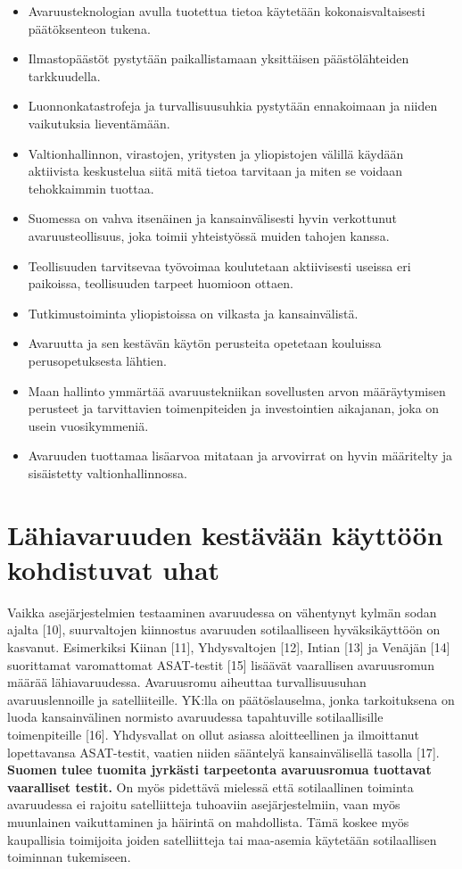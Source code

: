 \documentclass[nobib,finnish,oneside,openany,notoc,a4paper]{tufte-book}
\begin{document}
\begin{itemize}
\item Avaruusteknologian avulla tuotettua
tietoa käytetään kokonaisvaltaisesti päätöksenteon tukena.
\item Ilmastopäästöt pystytään paikallistamaan yksittäisen päästölähteiden
tarkkuudella.
\item Luonnonkatastrofeja ja turvallisuusuhkia pystytään
ennakoimaan ja niiden vaikutuksia lieventämään.
\item Valtionhallinnon, virastojen, yritysten ja yliopistojen välillä käydään aktiivista
keskustelua siitä mitä tietoa tarvitaan ja miten se voidaan tehokkaimmin
tuottaa.
\item Suomessa on vahva itsenäinen ja kansainvälisesti hyvin
verkottunut avaruusteollisuus, joka toimii yhteistyössä muiden tahojen
kanssa.
\item Teollisuuden tarvitsevaa työvoimaa koulutetaan aktiivisesti
useissa eri paikoissa, teollisuuden tarpeet huomioon ottaen.
\item Tutkimustoiminta yliopistoissa on vilkasta ja kansainvälistä.
\item Avaruutta ja sen kestävän käytön perusteita opetetaan kouluissa perusopetuksesta
lähtien.
\item Maan hallinto ymmärtää avaruustekniikan sovellusten arvon
määräytymisen perusteet ja tarvittavien toimenpiteiden ja investointien
aikajanan, joka on usein vuosikymmeniä.
\item Avaruuden tuottamaa lisäarvoa mitataan ja arvovirrat on hyvin määritelty ja sisäistetty valtionhallinnossa.
\end{itemize}

\chapter{Lähiavaruuden kestävään käyttöön kohdistuvat uhat}

Vaikka asejärjestelmien testaaminen avaruudessa on vähentynyt kylmän
sodan ajalta {[}10{]}, suurvaltojen kiinnostus avaruuden sotilaalliseen
hyväksikäyttöön on kasvanut. Esimerkiksi Kiinan {[}11{]}, Yhdysvaltojen
{[}12{]}, Intian {[}13{]} ja Venäjän {[}14{]} suorittamat varomattomat
ASAT-testit {[}15{]} lisäävät vaarallisen avaruusromun määrää
lähiavaruudessa. Avaruusromu aiheuttaa turvallisuusuhan avaruuslennoille
ja satelliiteille. YK:lla on päätöslauselma, jonka tarkoituksena on
luoda kansainvälinen normisto avaruudessa tapahtuville sotilaallisille
toimenpiteille {[}16{]}. Yhdysvallat on ollut asiassa aloitteellinen ja
ilmoittanut lopettavansa ASAT-testit, vaatien niiden sääntelyä
kansainvälisellä tasolla {[}17{]}. \textbf{Suomen tulee tuomita jyrkästi
tarpeetonta avaruusromua tuottavat vaaralliset testit. }On myös
pidettävä mielessä että sotilaallinen toiminta avaruudessa ei rajoitu
satelliitteja tuhoaviin asejärjestelmiin, vaan myös muunlainen
vaikuttaminen ja häirintä on mahdollista. Tämä koskee myös kaupallisia
toimijoita joiden satelliitteja tai maa-asemia käytetään sotilaallisen
toiminnan tukemiseen.
\end{document}
